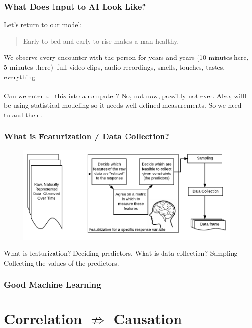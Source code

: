 \documentclass[slides]{beamer} %
\begin{document}
\begin{frame}\frametitle{What Does Input to AI Look Like?}

Let's return to our model:\\

\begin{quotation}
Early to bed and early to rise makes a man healthy.
\end{quotation}

We observe every encounter with the person for years and years (10 minutes here, 5 minutes there), full video clips, audio recordings, smells, touches, tastes, everything.\\~\\

Can we enter all this into a computer? No, not now, possibly not ever. Also, willl be using statistical modeling so it needs well-defined measurements. So we need to  and then .

	
\end{frame}

\begin{frame}\frametitle{What is Featurization / Data Collection?}

\begin{figure}
\centering
\includegraphics[width=4.5in]{featurization}
\end{figure}

What is featurization? Deciding predictors. What is data collection? Sampling Collecting the values of the predictors.

\end{frame}

\begin{frame}\frametitle{Good Machine Learning}


	
\end{frame}

\section{Correlation  $\not \Rightarrow$  Causation}
\end{document}
